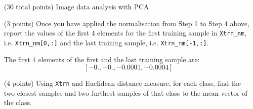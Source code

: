\documentclass[12pt]{article}
\begin{document}
\clearpage
%
%

\begin{question}{(30 total points) Image data analysis with PCA}

  
  

  
  \medskip

  \begin{subquestion}{(3 points)
      Once you have applied the normalisation from Step 1 to Step 4 above,
      report the values of the first 4 elements for the first training
      sample in \texttt{Xtrn\_nm},
      i.e. \texttt{Xtrn\_nm[0,:]} and the last training sample,
      i.e. \texttt{Xtrn\_nm[-1,:]}.
    } \label{Q1.1}
    

      \begin{answerbox}{10em}
         The first 4 elements of the first and the last training sample are:
         $$[-0.    , -0.    , -0.0001, -0.0004]$$
      \end{answerbox}
  


   \end{subquestion}
   \begin{subquestion}{(4 points)
      Using {\tt Xtrn} and Euclidean distance
      measure, for each class,
      find the two closest samples and two furthest
      samples of that class to the mean vector of the class.
    }  \label{Q1.2}





\end{subquestion}
\end{question}
\end{document}
